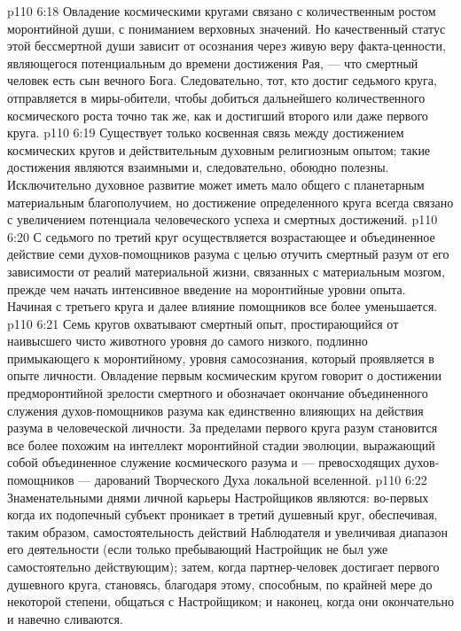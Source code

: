 \vs p110 6:18 Овладение космическими кругами связано с количественным ростом моронтийной души, с пониманием верховных значений. Но качественный статус этой бессмертной души  зависит от осознания через живую веру факта\hyp{}ценности, являющегося потенциальным до времени достижения Рая, --- что смертный человек есть сын вечного Бога. Следовательно, тот, кто достиг седьмого круга, отправляется в миры\hyp{}обители, чтобы добиться дальнейшего количественного космического роста точно так же, как и достигший второго или даже первого круга.
\vs p110 6:19 Существует только косвенная связь между достижением космических кругов и действительным духовным религиозным опытом; такие достижения являются взаимными и, следовательно, обоюдно полезны. Исключительно духовное развитие может иметь мало общего с планетарным материальным благополучием, но достижение определенного круга всегда связано с увеличением потенциала человеческого успеха и смертных достижений.
\vs p110 6:20 С седьмого по третий круг осуществляется возрастающее и объединенное действие семи духов\hyp{}помощников разума с целью отучить смертный разум от его зависимости от реалий материальной жизни, связанных с материальным мозгом, прежде чем начать интенсивное введение на моронтийные уровни опыта. Начиная с третьего круга и далее влияние помощников все более уменьшается.
\vs p110 6:21 \pc Семь кругов охватывают смертный опыт, простирающийся от наивысшего чисто животного уровня до самого низкого, подлинно примыкающего к моронтийному, уровня самосознания, который проявляется в опыте личности. Овладение первым космическим кругом говорит о достижении предморонтийной зрелости смертного и обозначает окончание объединенного служения духов\hyp{}помощников разума как единственно влияющих на действия разума в человеческой личности. За пределами первого круга разум становится все более похожим на интеллект моронтийной стадии эволюции, выражающий собой объединенное служение космического разума и --- превосходящих духов\hyp{}помощников --- дарований Творческого Духа локальной вселенной.
\vs p110 6:22 Знаменательными днями личной карьеры Настройщиков являются: во\hyp{}первых когда их подопечный субъект проникает в третий душевный круг, обеспечивая, таким образом, самостоятельность действий Наблюдателя и увеличивая диапазон его деятельности (если только пребывающий Настройщик не был уже самостоятельно действующим); затем, когда партнер\hyp{}человек достигает первого душевного круга, становясь, благодаря этому, способным, по крайней мере до некоторой степени, общаться с Настройщиком; и наконец, когда они окончательно и навечно сливаются.
